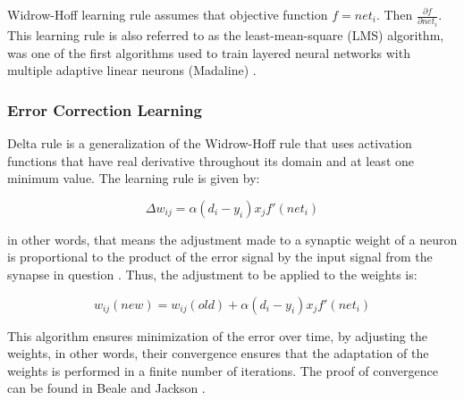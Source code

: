 Widrow-Hoff learning rule assumes that objective function $f = net_i$. Then $\frac{\partial f}{\partial net_i}$. This learning rule is also referred to as the least-mean-square (LMS) algorithm, was one of the first algorithms used to train layered neural networks with multiple adaptive linear neurons (Madaline) \cite{engelbrecht2007computational}.

\subsubsection{Error Correction Learning}

Delta rule is a generalization of the Widrow-Hoff rule \cite{widrow1960adaptive} that uses activation functions that have real derivative throughout its domain and at least one minimum value. The learning rule is given by:

\begin{equation}
\label{eq:deltarule}
\Delta w_{ij} = \alpha(d_i - y_i)x_jf'(net_i)
\end{equation}

in other words, that means the adjustment made to a synaptic weight of a neuron is proportional to the product of the error signal by the input signal from the synapse in question \cite{haykin-1994}. Thus, the adjustment to be applied to the weights is:

\begin{equation}
\label{eq:peso_novo}
w_{ij}(new) = w_{ij}(old) + \alpha(d_i - y_i)x_jf'(net_i)
\end{equation}

This algorithm ensures minimization of the error over time, by adjusting the weights, in other words, their convergence ensures that the adaptation of the weights is performed in a finite number of iterations. The proof of convergence can be found in Beale and Jackson \cite{beale2010neural}.

